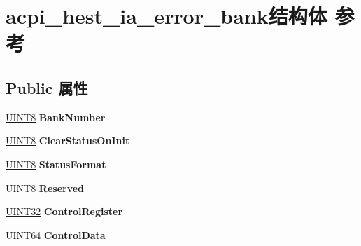 \hypertarget{structacpi__hest__ia__error__bank}{}\section{acpi\+\_\+hest\+\_\+ia\+\_\+error\+\_\+bank结构体 参考}
\label{structacpi__hest__ia__error__bank}
\subsection*{Public 属性}
\begin{DoxyCompactItemize}
\item 
\mbox{\label{structacpi__hest__ia__error__bank_a04f854bc28411c7e9aebd1ebacace4c0}} 
\hyperlink{_processor_bind_8h_ab27e9918b538ce9d8ca692479b375b6a}{U\+I\+N\+T8} {\bfseries Bank\+Number}
\item 
\mbox{\label{structacpi__hest__ia__error__bank_a9d49bb75b34ce677956a99950e786956}} 
\hyperlink{_processor_bind_8h_ab27e9918b538ce9d8ca692479b375b6a}{U\+I\+N\+T8} {\bfseries Clear\+Status\+On\+Init}
\item 
\mbox{\label{structacpi__hest__ia__error__bank_a8ff3fc9aa660fca7bd93f385f20afad7}} 
\hyperlink{_processor_bind_8h_ab27e9918b538ce9d8ca692479b375b6a}{U\+I\+N\+T8} {\bfseries Status\+Format}
\item 
\mbox{\label{structacpi__hest__ia__error__bank_a6127791b9e5a87297adca9582ca5f238}} 
\hyperlink{_processor_bind_8h_ab27e9918b538ce9d8ca692479b375b6a}{U\+I\+N\+T8} {\bfseries Reserved}
\item 
\mbox{\label{structacpi__hest__ia__error__bank_aec26315ddc45f833d61dd1080dba5b45}} 
\hyperlink{_processor_bind_8h_ae1e6edbbc26d6fbc71a90190d0266018}{U\+I\+N\+T32} {\bfseries Control\+Register}
\item 
\mbox{\label{structacpi__hest__ia__error__bank_a9b616f8c984d5776509f7ace6d7b2a9d}} 
\hyperlink{_processor_bind_8h_a57be03562867144161c1bfee95ca8f7c}{U\+I\+N\+T64} {\bfseries Control\+Data}
\item 

\end{DoxyCompactItemize}
